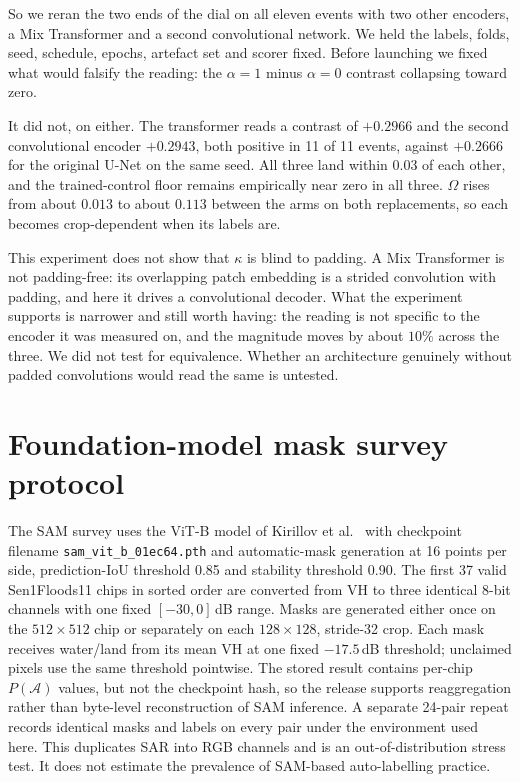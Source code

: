\documentclass[10pt,twocolumn,letterpaper]{article}
\newcommand{\kap}{\kappa}
\newcommand{\A}{\mathcal{A}}
\begin{document}
So we reran the two ends of the dial on all eleven events with two other encoders, a
Mix Transformer and a second convolutional network. We held the labels, folds, seed,
schedule, epochs, artefact set and scorer fixed. Before launching we fixed what
would falsify the reading: the $\alpha = 1$ minus $\alpha = 0$ contrast collapsing
toward zero.

It did not, on either. The transformer reads a contrast of $+0.2966$ and the second
convolutional encoder $+0.2943$, both positive in 11 of 11 events, against
$+0.2666$ for the original U-Net on the same seed. All three land within $0.03$ of
each other, and the trained-control floor remains empirically near zero in all
three. $\Omega$ rises from about $0.013$ to about $0.113$ between the arms on both
replacements, so each becomes crop-dependent when its labels are.

This experiment does not show that $\kap$ is blind to padding. A Mix Transformer
is not padding-free: its overlapping
patch embedding is a strided convolution with padding, and here it drives a
convolutional decoder. What the experiment supports is narrower and still worth
having: the reading is not specific to the encoder it was measured on, and the
magnitude moves by about $10\%$ across the three. We did not test for equivalence.
Whether an architecture genuinely without
padded convolutions would read the same is untested.

\section{Foundation-model mask survey protocol}

The SAM survey uses the ViT-B model of Kirillov et al.~\cite{kirillov2023segment}
with checkpoint filename \texttt{sam\_vit\_b\_01ec64.pth} and automatic-mask
generation at 16 points per side, prediction-IoU threshold 0.85 and stability
threshold 0.90. The first 37 valid Sen1Floods11 chips in sorted order are converted
from VH to three identical 8-bit channels with one fixed $[-30,0]$\,dB range. Masks
are generated either once on the $512\times512$ chip or separately on each
$128\times128$, stride-32 crop. Each mask receives water/land from its mean VH at one
fixed $-17.5$\,dB threshold; unclaimed pixels use the same threshold pointwise. The
stored result contains per-chip $P(\A)$ values, but not the checkpoint hash, so the
release supports reaggregation rather than byte-level reconstruction of SAM
inference. A separate 24-pair repeat records identical masks and labels on every
pair under the environment used here. This duplicates SAR into RGB channels and is
an out-of-distribution stress test. It does not estimate the prevalence of SAM-based
auto-labelling practice.
\end{document}
